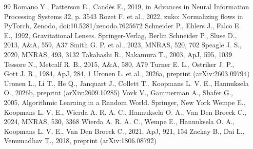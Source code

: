 \begin{thebibliography}{99}
Romano Y., Patterson E., Cand{\`e}s E., 2019, in Advances in Neural Information Processing Systems 32, p. 3543
Rozet F. et al., 2022, zuko: Normalizing flows in PyTorch, Zenodo, doi:10.5281/zenodo.7625672
Schneider P., Ehlers J., Falco E. E., 1992, Gravitational Lenses. Springer-Verlag, Berlin
Schneider P., Sluse D., 2013, A\&A, 559, A37
Smith G. P. et al., 2023, MNRAS, 520, 702
Speagle J. S., 2020, MNRAS, 493, 3132
Takahashi R., Nakamura T., 2003, ApJ, 595, 1039
Tessore N., Metcalf R. B., 2015, A\&A, 580, A79
Turner E. L., Ostriker J. P., Gott J. R., 1984, ApJ, 284, 1
Uronen L. et al., 2026a, preprint (arXiv:2603.09794)
Uronen L., Li T., He Q., Janquart J., Collett T., Koopmans L. V. E., Hannuksela O., 2026b, preprint (arXiv:2609.10285)
Vovk V., Gammerman A., Shafer G., 2005, Algorithmic Learning in a Random World. Springer, New York
Wempe E., Koopmans L. V. E., Wierda A. R. A. C., Hannuksela O. A., Van Den Broeck C., 2024, MNRAS, 530, 3368
Wierda A. R. A. C., Wempe E., Hannuksela O. A., Koopmans L. V. E., Van Den Broeck C., 2021, ApJ, 921, 154
Zackay B., Dai L., Venumadhav T., 2018, preprint (arXiv:1806.08792)
\end{thebibliography}
